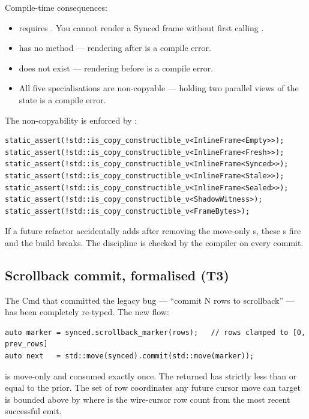 Compile-time consequences:

\begin{itemize}[leftmargin=*]
  \item {} requires
    . You cannot render a Synced frame
    without first calling .
  \item {} has no  method ---
    rendering after  is a compile error.
  \item {} does not exist ---
    rendering before  is a compile error.
  \item All five specialisations are non-copyable ---
    holding two parallel views of the state is a compile error.
\end{itemize}

The non-copyability is enforced by :

\begin{lstlisting}
static_assert(!std::is_copy_constructible_v<InlineFrame<Empty>>);
static_assert(!std::is_copy_constructible_v<InlineFrame<Fresh>>);
static_assert(!std::is_copy_constructible_v<InlineFrame<Synced>>);
static_assert(!std::is_copy_constructible_v<InlineFrame<Stale>>);
static_assert(!std::is_copy_constructible_v<InlineFrame<Sealed>>);
static_assert(!std::is_copy_constructible_v<ShadowWitness>);
static_assert(!std::is_copy_constructible_v<FrameBytes>);
\end{lstlisting}

If a future refactor accidentally adds  after
removing the move-only s, these s
fire and the build breaks. The discipline is checked by the
compiler on every commit.

\subsection{Scrollback commit, formalised (T3)}

The Cmd that committed the legacy bug --- ``commit N rows to
scrollback'' --- has been completely re-typed. The new flow:

\begin{lstlisting}
auto marker = synced.scrollback_marker(rows);   // rows clamped to [0, prev_rows]
auto next   = std::move(synced).commit(std::move(marker));
\end{lstlisting}

 is move-only and consumed exactly once. The
returned  has  strictly
less than or equal to the prior. The set of row coordinates any
future cursor move can target is bounded above by
 where  is the wire-cursor
row count from the most recent successful emit.

